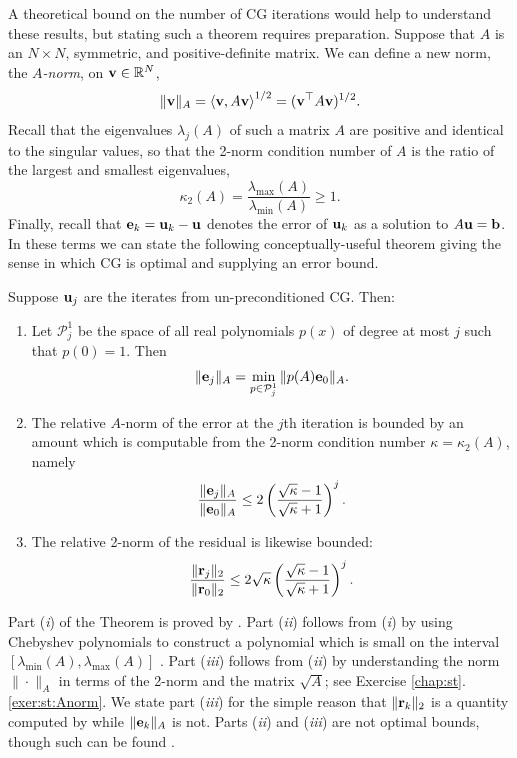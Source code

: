 A theoretical bound on the number of CG iterations would help to understand these results, but stating such a theorem requires preparation.  Suppose that $A$ is an $N\times N$, symmetric, and positive-definite matrix.  We can define a new norm, the \emph{$A$-norm}, on $\mathbf{v}\in\mathbb{R}^N$,
\begin{equation}
\|\mathbf{v}\|_A = \left<\mathbf{v},A\mathbf{v}\right>^{1/2} = (\mathbf{v}^\top A\mathbf{v})^{1/2}.  \label{normAdefn}
\end{equation}
Recall that the eigenvalues $\lambda_j(A)$ of such a matrix $A$ are positive and identical to the singular values, so that the 2-norm condition number of $A$ is the ratio of the largest and smallest eigenvalues,
	$$\kappa_2(A) = \frac{\lambda_{\max}(A)}{\lambda_{\min}(A)} \ge 1.$$
Finally, recall that $\mathbf{e}_k = \mathbf{u}_k - \mathbf{u}$ denotes the error of $\mathbf{u}_k$ as a solution to $A\mathbf{u}=\mathbf{b}$.  In these terms we can state the following conceptually-useful theorem giving the sense in which CG is optimal and supplying an error bound.

\renewcommand{\labelenumi}{(\roman{enumi})}
\begin{theorem}  \label{thm:cgiterations}
Suppose $\mathbf{u}_j$ are the iterates from un-preconditioned CG.  Then:\begin{enumerate}
\item Let $\mathcal{P}_j^1$ be the space of all real polynomials $p(x)$ of degree at most $j$ such that $p(0)=1$.  Then
    $$\|\mathbf{e}_j\|_A = \min_{p \in \mathcal{P}_j^1} \|p(A) \mathbf{e}_0\|_A.$$
\item The relative $A$-norm of the error at the $j$th iteration is bounded by an amount which is computable from the 2-norm condition number $\kappa=\kappa_2(A)$, namely
	$$\frac{\|\mathbf{e}_j\|_A}{\|\mathbf{e}_0\|_A} \le 2 \left(\frac{\sqrt{\kappa}-1}{\sqrt{\kappa}+1}\right)^j.$$
\item The relative 2-norm of the residual is likewise bounded:
	$$\frac{\|\mathbf{r}_j\|_2}{\|\mathbf{r}_0\|_2} \le 2 \sqrt{\kappa} \left(\frac{\sqrt{\kappa}-1}{\sqrt{\kappa}+1}\right)^j.$$
\end{enumerate}
\end{theorem}

Part (\emph{i}) of the Theorem is proved by \citet[p.~50]{Greenbaum1997}.  Part (\emph{ii}) follows from (\emph{i}) by using Chebyshev polynomials to construct a polynomial which is small on the interval $[\lambda_{\min}(A),\lambda_{\max}(A)]$ \citep[p.~51]{Greenbaum1997}.  Part (\emph{iii}) follows from (\emph{ii}) by understanding the norm $\|\cdot\|_A$ in terms of the 2-norm and the matrix $\sqrt{A}$; see Exercise \ref{chap:st}.\ref{exer:st:Anorm}.  We state part (\emph{iii}) for the simple reason that $\|\mathbf{r}_k\|_2$ is a quantity computed by \PETSc while $\|\mathbf{e}_k\|_A$ is not.  Parts (\emph{ii}) and (\emph{iii}) are not optimal bounds, though such can be found \citep[p.~51]{Greenbaum1997}.

